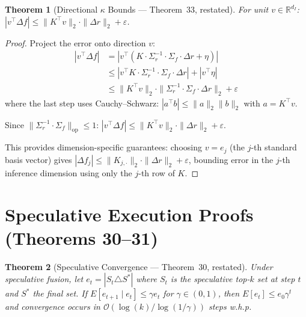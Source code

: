 \documentclass{article}
\newtheorem{theorem}{Theorem}
\theoremstyle{definition}
\theoremstyle{remark}
\newcommand{\BigO}{\mathcal{O}}
\begin{document}
\begin{theorem}[Directional $\kappa$ Bounds --- Theorem~33, restated]\label{thm:kappa-dir-app}
For unit $v \in \mathbb{R}^{d_I}$: $|v^\top \Delta f| \leq \|K^\top v\|_2 \cdot \|\Delta r\|_2 + \varepsilon$.
\end{theorem}

\begin{proof}
Project the error onto direction $v$:
\begin{align*}
|v^\top \Delta f| &= |v^\top (K \cdot \Sigma_r^{-1} \cdot \Sigma_f \cdot \Delta r + \eta)| \\
&\leq |v^\top K \cdot \Sigma_r^{-1} \cdot \Sigma_f \cdot \Delta r| + |v^\top \eta| \\
&\leq \|K^\top v\|_2 \cdot \|\Sigma_r^{-1} \cdot \Sigma_f \cdot \Delta r\|_2 + \varepsilon
\end{align*}
where the last step uses Cauchy--Schwarz: $|a^\top b| \leq \|a\|_2 \|b\|_2$ with $a = K^\top v$.

Since $\|\Sigma_r^{-1} \cdot \Sigma_f\|_{\mathrm{op}} \leq 1$: $|v^\top \Delta f| \leq \|K^\top v\|_2 \cdot \|\Delta r\|_2 + \varepsilon$.

This provides dimension-specific guarantees: choosing $v = e_j$ (the $j$-th standard basis vector) gives $|\Delta f_j| \leq \|K_{j,\cdot}\|_2 \cdot \|\Delta r\|_2 + \varepsilon$, bounding error in the $j$-th inference dimension using only the $j$-th row of $K$.
\end{proof}

\section{Speculative Execution Proofs (Theorems 30--31)}\label{app:speculative-proofs}

\begin{theorem}[Speculative Convergence --- Theorem~30, restated]\label{thm:spec-converge-app}
Under speculative fusion, let $e_t = |S_t \triangle S^*|$ where $S_t$ is the speculative top-$k$ set at step $t$ and $S^*$ the final set. If $E[e_{t+1} \mid e_t] \leq \gamma e_t$ for $\gamma \in (0,1)$, then $E[e_t] \leq e_0 \gamma^t$ and convergence occurs in $\BigO(\log(k)/\log(1/\gamma))$ steps w.h.p.
\end{theorem}
\end{document}
